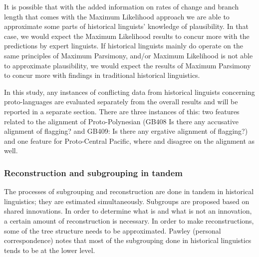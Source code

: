 \documentclass[a4paper,10pt]{article} %
\begin{document}
It is possible that with the added information on rates of change and branch length that comes with the Maximum Likelihood approach we are able to approximate some parts of historical linguists' knowledge of plausibility. In that case, we would expect the Maximum Likelihood results to concur more with the predictions by expert linguists. If historical linguists mainly do operate on the same principles of Maximum Parsimony, and/or Maximum Likelihood is not able to approximate plausibility, we would expect the results of Maximum Parsimony to concur more with findings in traditional historical linguistics.

In this study, any instances of conflicting data from historical linguists concerning proto-languages are evaluated separately from the overall results and will be reported in a separate section. There are three instances of this: two features related to the alignment of Proto-Polynesian (GB408 Is there any accusative alignment of flagging? and GB409: Is there any ergative alignment of flagging?) and one feature for Proto-Central Pacific, where \citet{kikusawa2002proto} and \citet{ball2007ergativity} disagree on the alignment as well.


\subsubsection{Reconstruction and subgrouping in tandem}
The processes of subgrouping and reconstruction are done in tandem in historical linguistics; they are estimated simultaneously. Subgroups are proposed based on shared innovations. In order to determine what is and what is not an innovation, a certain amount of reconstruction is necessary. In order to make reconstructions, some of the tree structure needs to be approximated. Pawley (personal correspondence) notes that most of the subgrouping done in historical linguistics tends to be at the lower level. 
\end{document}
